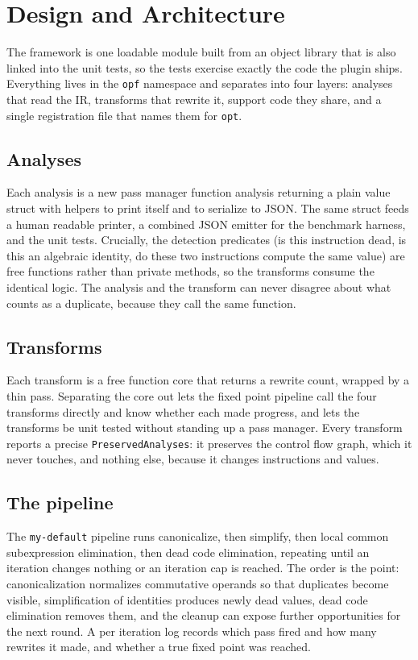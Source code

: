 \section{Design and Architecture}

The framework is one loadable module built from an object library that is also
linked into the unit tests, so the tests exercise exactly the code the plugin
ships. Everything lives in the \texttt{opf} namespace and separates into four
layers: analyses that read the IR, transforms that rewrite it, support code they
share, and a single registration file that names them for \texttt{opt}.

\subsection{Analyses}

Each analysis is a new pass manager function analysis returning a plain value
struct with helpers to print itself and to serialize to JSON. The same struct
feeds a human readable printer, a combined JSON emitter for the benchmark
harness, and the unit tests. Crucially, the detection predicates (is this
instruction dead, is this an algebraic identity, do these two instructions
compute the same value) are free functions rather than private methods, so the
transforms consume the identical logic. The analysis and the transform can never
disagree about what counts as a duplicate, because they call the same function.

\subsection{Transforms}

Each transform is a free function core that returns a rewrite count, wrapped by a
thin pass. Separating the core out lets the fixed point pipeline call the four
transforms directly and know whether each made progress, and lets the transforms
be unit tested without standing up a pass manager. Every transform reports a
precise \texttt{PreservedAnalyses}: it preserves the control flow graph, which it
never touches, and nothing else, because it changes instructions and values.

\subsection{The pipeline}

The \texttt{my-default} pipeline runs canonicalize, then simplify, then local
common subexpression elimination, then dead code elimination, repeating until an
iteration changes nothing or an iteration cap is reached. The order is the point:
canonicalization normalizes commutative operands so that duplicates become
visible, simplification of identities produces newly dead values, dead code
elimination removes them, and the cleanup can expose further opportunities for
the next round. A per iteration log records which pass fired and how many
rewrites it made, and whether a true fixed point was reached.
